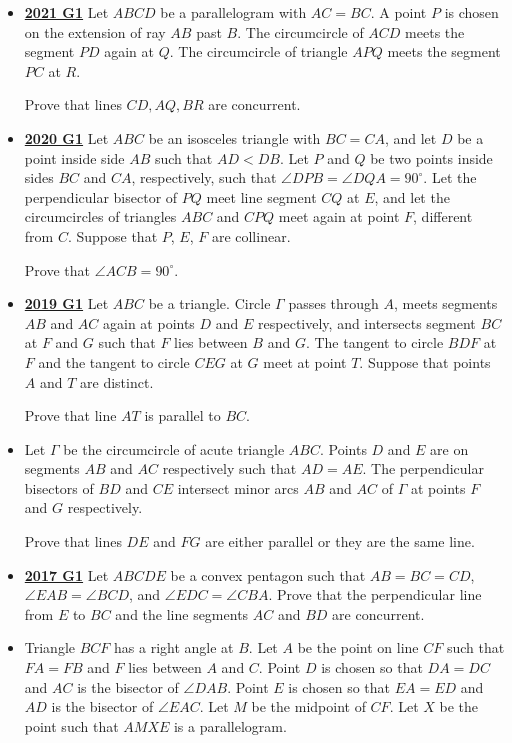 \documentclass[11pt]{scrartcl}
\begin{document}
\begin{itemize}[leftmargin=*]
    Prove that the points $P,S,Q,R$ lie on a circle.
\item \href{https://artofproblemsolving.com/community/c6h2882542p25627509}{\textbf{2021 G1}} Let $ABCD$ be a parallelogram with $AC=BC.$ A point $P$ is chosen on the extension of ray $AB$ past $B.$ The circumcircle of $ACD$ meets the segment $PD$ again at $Q.$ The circumcircle of triangle $APQ$ meets the segment $PC$ at $R.$ 

Prove that lines $CD,AQ,BR$ are concurrent.

\item \href{https://artofproblemsolving.com/community/c6h2625929p22698577}{\textbf{2020 G1}} Let $ABC$ be an isosceles triangle with $BC=CA$, and let $D$ be a point inside side $AB$ such that $AD< DB$. Let $P$ and $Q$ be two points inside sides $BC$ and $CA$, respectively, such that $\angle DPB = \angle DQA = 90^{\circ}$. Let the perpendicular bisector of $PQ$ meet line segment $CQ$ at $E$, and let the circumcircles of triangles $ABC$ and $CPQ$ meet again at point $F$, different from $C$.
Suppose that $P$, $E$, $F$ are collinear. 

Prove that $\angle ACB = 90^{\circ}$.
\item \href{https://artofproblemsolving.com/community/c6h2278984p17828603}{\textbf{2019 G1}} Let $ABC$ be a triangle. Circle $\Gamma$ passes through $A$, meets segments $AB$ and $AC$ again at points $D$ and $E$ respectively, and intersects segment $BC$ at $F$ and $G$ such that $F$ lies between $B$ and $G$. The tangent to circle $BDF$ at $F$ and the tangent to circle $CEG$ at $G$ meet at point $T$. Suppose that points $A$ and $T$ are distinct. 

Prove that line $AT$ is parallel to $BC$.
\item {}  Let $\Gamma$ be the circumcircle of acute triangle $ABC$. Points $D$ and $E$ are on segments $AB$ and $AC$ respectively such that $AD = AE$. The perpendicular bisectors of $BD$ and $CE$ intersect minor arcs $AB$ and $AC$ of $\Gamma$ at points $F$ and $G$ respectively.

Prove that lines $DE$ and $FG$ are either parallel or they are the same line.
\item \href{https://artofproblemsolving.com/community/c6h1671264p10632265}{\textbf{2017 G1}} Let $ABCDE$ be a convex pentagon such that $AB=BC=CD$, $\angle{EAB}=\angle{BCD}$, and $\angle{EDC}=\angle{CBA}$. Prove that the perpendicular line from $E$ to $BC$ and the line segments $AC$ and $BD$ are concurrent.
\item {}  Triangle $BCF$ has a right angle at $B$. Let $A$ be the point on line $CF$ such that $FA=FB$ and $F$ lies between $A$ and $C$. Point $D$ is chosen so that $DA=DC$ and $AC$ is the bisector of $\angle{DAB}$. Point $E$ is chosen so that $EA=ED$ and $AD$ is the bisector of $\angle{EAC}$. Let $M$ be the midpoint of $CF$. Let $X$ be the point such that $AMXE$ is a parallelogram. 


\end{itemize}
\end{document}
